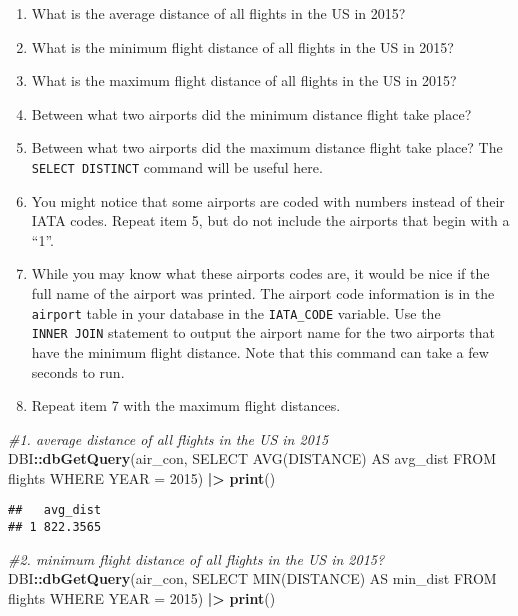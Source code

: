 \documentclass[
]{article}
\newenvironment{Shaded}{\begin{snugshade}}{\end{snugshade}}
\newcommand{\CommentTok}[1]{\textcolor[rgb]{0.56,0.35,0.01}{\textit{#1}}}
\newcommand{\FunctionTok}[1]{\textcolor[rgb]{0.13,0.29,0.53}{\textbf{#1}}}
\newcommand{\NormalTok}[1]{#1}
\newcommand{\SpecialCharTok}[1]{\textcolor[rgb]{0.81,0.36,0.00}{\textbf{#1}}}
\newcommand{\StringTok}[1]{\textcolor[rgb]{0.31,0.60,0.02}{#1}}
\providecommand{\tightlist}{%
  \setlength{\itemsep}{0pt}\setlength{\parskip}{0pt}}
\begin{document}
\begin{enumerate}
\def\labelenumi{\arabic{enumi}.}
\tightlist
\item
  What is the average distance of all flights in the US in 2015?
\item
  What is the minimum flight distance of all flights in the US in 2015?
\item
  What is the maximum flight distance of all flights in the US in 2015?
\item
  Between what two airports did the minimum distance flight take place?
\item
  Between what two airports did the maximum distance flight take place?
  The \texttt{SELECT\ DISTINCT} command will be useful here.
\item
  You might notice that some airports are coded with numbers instead of
  their IATA codes. Repeat item 5, but do not include the airports that
  begin with a ``1''.
\item
  While you may know what these airports codes are, it would be nice if
  the full name of the airport was printed. The airport code information
  is in the \texttt{airport} table in your database in the
  \texttt{IATA\_CODE} variable. Use the \texttt{INNER\ JOIN} statement
  to output the airport name for the two airports that have the minimum
  flight distance. Note that this command can take a few seconds to run.
\item
  Repeat item 7 with the maximum flight distances.
\end{enumerate}

\begin{Shaded}
\begin{Highlighting}[]
\CommentTok{\#1. average distance of all flights in the US in 2015}
\NormalTok{DBI}\SpecialCharTok{::}\FunctionTok{dbGetQuery}\NormalTok{(air\_con, }\StringTok{\textquotesingle{}SELECT AVG(DISTANCE) AS avg\_dist }
\StringTok{           FROM flights }
\StringTok{           WHERE YEAR = 2015\textquotesingle{}}\NormalTok{) }\SpecialCharTok{|\textgreater{}} \FunctionTok{print}\NormalTok{()}
\end{Highlighting}
\end{Shaded}

\begin{verbatim}
##   avg_dist
## 1 822.3565
\end{verbatim}

\begin{Shaded}
\begin{Highlighting}[]
\CommentTok{\#2. minimum flight distance of all flights in the US in 2015?}
\NormalTok{DBI}\SpecialCharTok{::}\FunctionTok{dbGetQuery}\NormalTok{(air\_con, }\StringTok{\textquotesingle{}SELECT MIN(DISTANCE) AS min\_dist }
\StringTok{           FROM flights }
\StringTok{           WHERE YEAR = 2015\textquotesingle{}}\NormalTok{) }\SpecialCharTok{|\textgreater{}} \FunctionTok{print}\NormalTok{()}
\end{Highlighting}
\end{Shaded}
\end{document}
